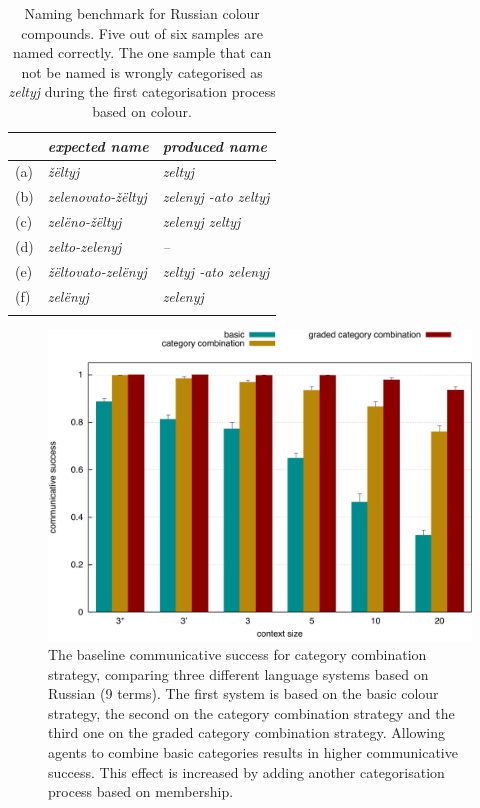 \begin{table}[htpb]
  \centering
  \begin{tabular}{l>{\itshape}l>{\itshape}l}
  \lsptoprule
    & \normalfont expected name & \normalfont produced name \\
    \midrule
    (a) & \v z\"eltyj & zeltyj \\
    (b) & zelenovato-\v z\"eltyj  & zelenyj -ato zeltyj \\
    (c) & zel\"eno-\v z\"eltyj & zelenyj zeltyj \\
    (d) & zelto-zelenyj & \normalfont -- \\
    (e) & \v z\"eltovato-zel\"enyj & zeltyj -ato zelenyj \\
    (f) & zel\"enyj & zelenyj \\
    \lspbottomrule
  \end{tabular}
  \caption[Naming benchmark for Russian colour compounds]{Naming benchmark for Russian colour compounds. Five out of six samples are named correctly. The one sample that can not be named is wrongly categorised as \textit{zeltyj} during the first categorisation process based on colour.}
  \label{t:ccs-russian-naming-benchmark}
\end{table}

\begin{figure}[p]
  \centering
  \includegraphics[width=\textwidth]{./category-combination/figures/baseline.pdf}
  \caption[The baseline communicative success for category combination
  strategy]{The baseline communicative success for category
    combination strategy, comparing three different language systems
    based on Russian (9 terms). The first system is based on the basic
    colour strategy, the second on the category combination strategy
    and the third one on the graded category combination
    strategy. Allowing agents to combine basic categories results in
    higher communicative success. This effect is increased by adding
    another categorisation process based on membership.}
  \label{f:ccs-baseline}
\end{figure}

